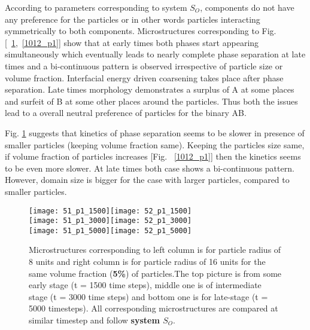 \documentclass[12pt]{iiscthes}
\theoremstyle{definition}
\theoremstyle{definition}
\theoremstyle{remark}
\begin{document}
According to parameters corresponding to system $S_O$, components do not have any preference for the particles or in other words particles interacting symmetrically to both components. Microstructures corresponding to Fig. [~\ref{512_p1},~\ref{1012_p1}] show that  at early times both phases start appearing simultaneously which eventually leads to nearly complete phase separation at late times and a bi-continuous pattern is observed irrespective of particle size or volume fraction. Interfacial energy driven coarsening takes place after phase separation. Late times morphology demonstrates a surplus of A at some places and surfeit of B at some other places around the particles. Thus both the issues lead to a overall neutral preference of particles for the binary AB.  

Fig. \ref{512_p1} suggests that kinetics of phase separation seems to be slower in presence of smaller particles (keeping volume fraction same). Keeping the particles size same, if volume fraction of particles increases [Fig. ~\ref{1012_p1}] then the kinetics seems to be even more slower. At late times both case shows a bi-continuous pattern. However, domain size is bigger for the case with larger particles, compared to smaller particles. 
\newpage
\begin{figure}[H]
\begin{center}
\texttt{[image: 51\_p1\_1500]}\texttt{[image: 52\_p1\_1500]}\\
\texttt{[image: 51\_p1\_3000]}\texttt{[image: 52\_p1\_3000]}\\
\texttt{[image: 51\_p1\_5000]}\texttt{[image: 52\_p1\_5000]}\\
\caption{Microstructures corresponding to left column is for particle radius of 8 units and right column is for particle radius of 16 units for the same volume fraction (\textbf{5\%}) of particles.The top picture is from some early stage (t = 1500 time steps), middle one is of intermediate stage (t = 3000 time steps) and bottom one is for late-stage (t = 5000 timesteps). All corresponding microstructures are compared at similar timestep and follow \textbf{system $S_O$}.}\label{512_p1}
\end{center}
\end{figure}
\end{document}
